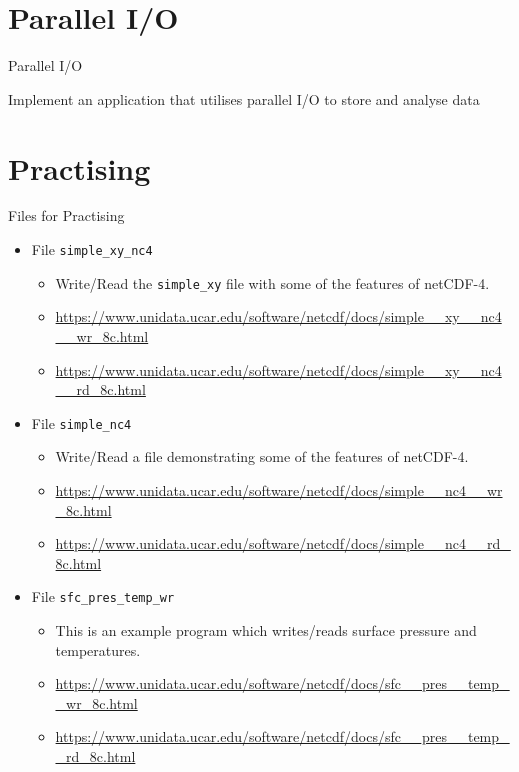 \documentclass[compress,11pt,xcolor=svgnames,aspectratio=169]{beamer}
\begin{document}
\section{Parallel I/O}

\begin{frame}[fragile]{Parallel I/O}

Implement an application that utilises parallel I/O to store and analyse data

\end{frame}

\section{Practising}

\begin{frame}[fragile]{Files for Practising}

\begin{itemize}

  \item {\scriptsize File \verb|simple_xy_nc4|}
    \begin{itemize}
      \item {\scriptsize Write/Read the \verb|simple_xy| file with some of the features of netCDF-4.}
      \item {\tiny \url{https://www.unidata.ucar.edu/software/netcdf/docs/simple__xy__nc4__wr_8c.html}}
      \item {\tiny \url{https://www.unidata.ucar.edu/software/netcdf/docs/simple__xy__nc4__rd_8c.html}}
    \end{itemize}

  \item {\scriptsize File \verb|simple_nc4|}
    \begin{itemize}
      \item {\scriptsize Write/Read a file demonstrating some of the features of netCDF-4.}
      \item {\tiny \url{https://www.unidata.ucar.edu/software/netcdf/docs/simple__nc4__wr_8c.html}}
      \item {\tiny \url{https://www.unidata.ucar.edu/software/netcdf/docs/simple__nc4__rd_8c.html}}
    \end{itemize}

  \item {\scriptsize File \verb|sfc_pres_temp_wr|}
    \begin{itemize}
      \item {\scriptsize This is an example program which writes/reads surface pressure and temperatures.}
      \item {\tiny \url{https://www.unidata.ucar.edu/software/netcdf/docs/sfc__pres__temp__wr_8c.html}}
      \item {\tiny \url{https://www.unidata.ucar.edu/software/netcdf/docs/sfc__pres__temp__rd_8c.html}}
    \end{itemize}


\end{itemize}
\end{frame}
\end{document}
